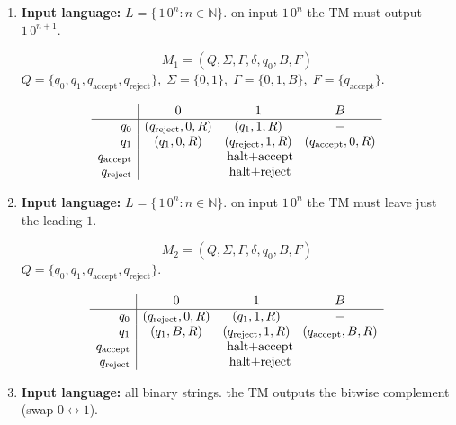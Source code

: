 \documentclass{article}
\theoremstyle{theorem}
\theoremstyle{definition}
\theoremstyle{remark}
\begin{document}
\begin{enumerate}
  \item \textbf{Input language:} \(L = \{\,1\,0^n : n\in\mathbb{N}\}\). on input \(1\,0^n\) the TM must output \(1\,0^{n+1}\).

        \[
          M_1 = (Q,\Sigma,\Gamma,\delta,q_0,B,F)
        \]
        \(Q=\{q_0,q_1,q_{\mathrm{accept}},q_{\mathrm{reject}}\},\;
          \Sigma=\{0,1\},\;
          \Gamma=\{0,1,B\},\;
          F=\{q_{\mathrm{accept}}\}\).

        \[
        \begin{array}{r|ccc}
                 & 0                  & 1                         & B \\ \hline
        q_0      & (q_{\mathrm{reject}},0,R) & (q_1,1,R)                 &  - \\
        q_1      & (q_1,0,R)          & (q_{\mathrm{reject}},1,R) & (q_{\mathrm{accept}},0,R)\\
        q_{\mathrm{accept}} & \multicolumn{3}{c}{\text{halt+accept}}\\
        q_{\mathrm{reject}} & \multicolumn{3}{c}{\text{halt+reject}}\\
        \end{array}
        \]

  \item \textbf{Input language:} \(L = \{\,1\,0^n : n\in\mathbb{N}\}\). on input \(1\,0^n\) the TM must leave just the leading \(1\).

        \[
          M_2 = (Q,\Sigma,\Gamma,\delta,q_0,B,F)
        \]
        \(Q=\{q_0,q_1,q_{\mathrm{accept}},q_{\mathrm{reject}}\}\).

        \[
        \begin{array}{r|ccc}
                 & 0                  & 1                         & B \\ \hline
        q_0      & (q_{\mathrm{reject}},0,R) & (q_1,1,R)                 &  - \\
        q_1      & (q_1,B,R)          & (q_{\mathrm{reject}},1,R) & (q_{\mathrm{accept}},B,R)\\
        q_{\mathrm{accept}} & \multicolumn{3}{c}{\text{halt+accept}}\\
        q_{\mathrm{reject}} & \multicolumn{3}{c}{\text{halt+reject}}\\
        \end{array}
        \]

  \item \textbf{Input language:} all binary strings. the TM outputs the bitwise complement (swap \(0\leftrightarrow1\)).


\end{enumerate}
\end{document}
